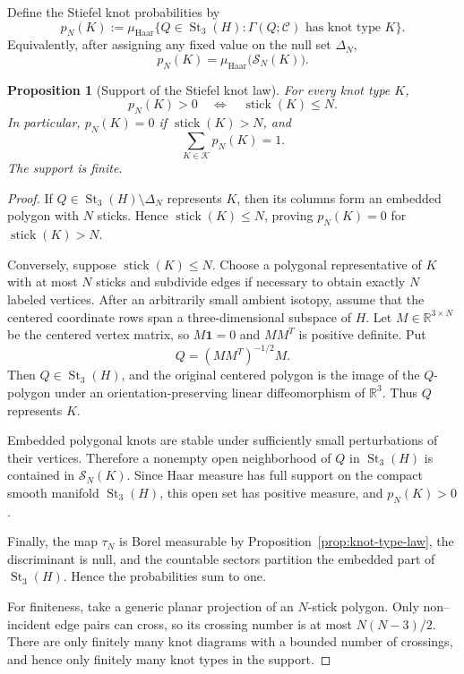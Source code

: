 \documentclass[11pt]{amsart}
\newtheorem{proposition}{Proposition}
\theoremstyle{remark}
\newcommand{\Rbb}{\mathbb{R}}
\newcommand{\1}{\mathbf{1}}
\newcommand{\Kcal}{\mathcal{K}}
\newcommand{\St}{\operatorname{St}}
\begin{document}
Define the Stiefel knot probabilities by
\[
    p_N(K)
    :=
    \mu_{\mathrm{Haar}}\{Q\in\St_3(H):\Gamma(Q;\mathcal C)\text{ has knot type }K\}.
\]
Equivalently, after assigning any fixed value on the null set \(\Delta_N\),
\[
    p_N(K)=\mu_{\mathrm{Haar}}\bigl(\mathcal S_N(K)\bigr).
\]

\begin{proposition}[Support of the Stiefel knot law]\label{prop:stiefel-support}
For every knot type \(K\),
\[
    p_N(K)>0
    \quad\Longleftrightarrow\quad
    \operatorname{stick}(K)\le N.
\]
In particular, \(p_N(K)=0\) if \(\operatorname{stick}(K)>N\), and
\[
    \sum_{K\in\Kcal}p_N(K)=1.
\]
The support is finite.
\end{proposition}

\begin{proof}
If \(Q\in\St_3(H)\setminus\Delta_N\) represents \(K\), then its columns form an embedded
polygon with \(N\) sticks.  Hence \(\operatorname{stick}(K)\le N\), proving
\(p_N(K)=0\) for \(\operatorname{stick}(K)>N\).

Conversely, suppose \(\operatorname{stick}(K)\le N\).  Choose a polygonal representative
of \(K\) with at most \(N\) sticks and subdivide edges if necessary to obtain exactly \(N\)
labeled vertices.  After an arbitrarily small ambient isotopy, assume that the centered
coordinate rows span a three-dimensional subspace of \(H\).  Let
\(M\in\Rbb^{3\times N}\) be the centered vertex matrix, so \(M\1=0\) and \(MM^T\) is
positive definite.  Put
\[
    Q=(MM^T)^{-1/2}M .
\]
Then \(Q\in\St_3(H)\), and the original centered polygon is the image of the \(Q\)-polygon
under an orientation-preserving linear diffeomorphism of \(\Rbb^3\).  Thus \(Q\)
represents \(K\).

Embedded polygonal knots are stable under sufficiently small perturbations of their
vertices.  Therefore a nonempty open neighborhood of \(Q\) in \(\St_3(H)\) is contained in
\(\mathcal S_N(K)\).  Since Haar measure has full support on the compact smooth manifold
\(\St_3(H)\), this open set has positive measure, and \(p_N(K)>0\).

Finally, the map \(\tau_N\) is Borel measurable by Proposition~\ref{prop:knot-type-law},
the discriminant is null, and the countable sectors partition the embedded part of
\(\St_3(H)\).  Hence the probabilities sum to one.

For finiteness, take a generic planar projection of an \(N\)-stick polygon.
Only non--incident edge pairs can cross, so its crossing number is at most
\(N(N-3)/2\).  There are only finitely many knot diagrams with a bounded
number of crossings, and hence only finitely many knot types in the support.
\end{proof}
\end{document}
